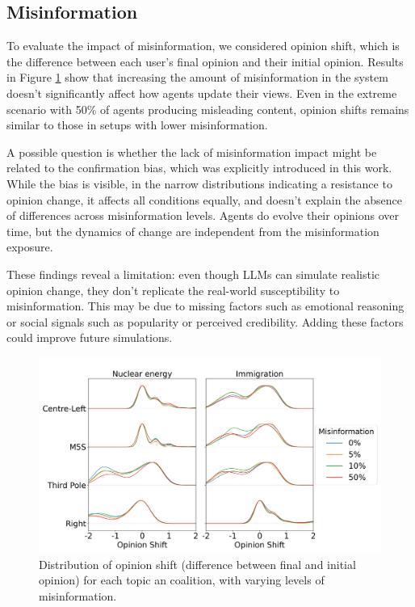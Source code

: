 \subsection{Misinformation}
To evaluate the impact of misinformation, we considered opinion shift, which is the difference between each user’s final opinion and their initial opinion.
Results in Figure \ref{fig:misinfo_opinion_shift} show that increasing the amount of misinformation in the system doesn’t significantly affect how agents update their views.
Even in the extreme scenario with 50\% of agents producing misleading content, opinion shifts remains similar to those in setups with lower misinformation.

A possible question is whether the lack of misinformation impact might be related to the confirmation bias, which was explicitly introduced in this work.
While the bias is visible, in the narrow distributions indicating a resistance to opinion change, it affects all conditions equally, and doesn't explain the absence of differences across misinformation levels.
Agents do evolve their opinions over time, but the dynamics of change are independent from the misinformation exposure.


These findings reveal a limitation: even though LLMs can simulate realistic opinion change, they don't replicate the real-world susceptibility to misinformation.
This may be due to missing factors such as emotional reasoning or social signals such as popularity or perceived credibility.
Adding these factors could improve future simulations.


\begin{figure}[h]
    \centering
    \includegraphics[width=1\linewidth]{Images/Misinformation/score_llm_RandomRecSys_small.png}
    \caption{Distribution of opinion shift (difference between final and initial opinion) for each topic an coalition, with varying levels of misinformation.}
    \label{fig:misinfo_opinion_shift}
\end{figure}


